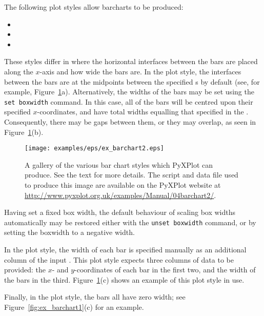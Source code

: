 The following plot styles allow barcharts to be produced:

\begin{itemize}
\item {}
\item {}
\item {}
\end{itemize}

\noindent These styles differ in where the horizontal interfaces between the
bars are placed along the $x$-axis and how wide the bars are.  In the
 plot style, the interfaces between the bars are at the midpoints
between the specified \datapoint s by default (see, for example,
Figure~\ref{fig:ex_barchart2}a).  Alternatively, the widths of the bars may be
set using the {\tt set boxwidth} command. In this case, all of the bars will be
centred upon their specified $x$-coordinates, and have total widths equalling
that specified in the . Consequently, there may be gaps
between them, or they may overlap, as seen in Figure~\ref{fig:ex_barchart2}(b).

\begin{figure}
\begin{center}
\texttt{[image: examples/eps/ex\_barchart2.eps]}
\end{center}
\caption[A gallery of the various bar chart styles which PyXPlot can produce]
{A gallery of the various bar chart styles which PyXPlot can produce.
See the text for more details.  The script and data file used to produce this
image are available on the PyXPlot website at
\protect\url{http://www.pyxplot.org.uk/examples/Manual/04barchart2/}.}
\label{fig:ex_barchart2}
\end{figure}

Having set a fixed box width, the default behaviour of scaling box widths
automatically may be restored either with the {\tt unset boxwidth} command,
or by setting the boxwidth to a negative width.

In the  plot style, the width of each bar is specified manually
as an additional column of the input \datafile.  This plot style expects three
columns of data to be provided: the $x$- and $y$-coordinates of each bar in the
first two, and the width of the bars in the third.
Figure~\ref{fig:ex_barchart2}(c) shows an example of this plot style in use.

Finally, in the  plot style, the bars all have zero width; see
Figure~\ref{fig:ex_barchart1}(c) for an example.


